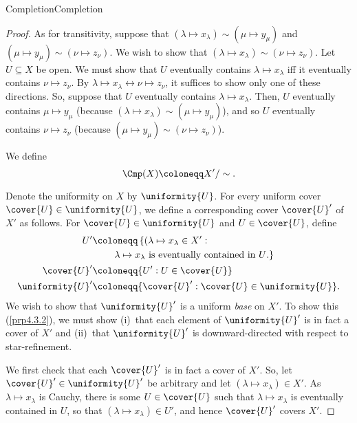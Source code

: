 \begin{thm}{Completion}{Completion}
\begin{proof}
As for transitivity, suppose that $(\lambda \mapsto x_\lambda )\sim (\mu \mapsto y_\mu )$ and $(\mu \mapsto y_\mu )\sim (\nu \mapsto z_\nu)$.  We wish to show that $(\lambda \mapsto x_\lambda )\sim (\nu \mapsto z_\nu )$.  Let $U\subseteq X$ be open.  We must show that $U$ eventually contains $\lambda \mapsto x_\lambda$ iff it eventually contains $\nu \mapsto z_\nu$.  By $\lambda \mapsto x_\lambda \leftrightarrow \nu \mapsto z_\nu$, it suffices to show only one of these directions.  So, suppose that $U$ eventually contains $\lambda \mapsto x_\lambda$.  Then, $U$ eventually contains $\mu \mapsto y_\mu$ (because $(\lambda \mapsto x_\lambda )\sim (\mu \mapsto y_\mu )$), and so $U$ eventually contains $\nu \mapsto z_\nu$ (because $(\mu \mapsto y_\mu )\sim (\nu \mapsto z_\nu )$).

We define
\begin{equation}
\Cmp (X)\coloneqq X'/\sim .
\end{equation}

Denote the uniformity on $X$ by $\uniformity{U}$.  For every uniform cover $\cover{U}\in \uniformity{U}$, we define a corresponding cover $\cover{U}'$ of $X'$ as follows.  For $\cover{U}\in \uniformity{U}$ and $U\in \cover{U}$, define
\begin{equation}\label{B.26}
\begin{split}
U' & \coloneqq \left\{ (\lambda \mapsto x_{\lambda}\in X':\right. \\ & \qquad \left. \lambda \mapsto x_{\lambda}\text{ is eventually contained in }U\text{.}\right\} \\
\cover{U}' & \coloneqq \{ U':U\in \cover{U}\} \\
\uniformity{U}' & \coloneqq \{ \cover{U}':\cover{U}\in \uniformity{U}\} .
\end{split}
\end{equation}
We wish to show that $\uniformity{U}'$ is a uniform \emph{base} on $X'$.  To show this (\cref{prp4.3.2}), we must show (i)~that each element of $\uniformity{U}'$ is in fact a cover of $X'$ and (ii)~that $\uniformity{U}'$ is downward-directed with respect to star-refinement.

We first check that each $\cover{U}'$ is in fact a cover of $X'$.  So, let $\cover{U}'\in \uniformity{U}'$ be arbitrary and let $(\lambda \mapsto x_{\lambda})\in X'$.  As $\lambda \mapsto x_{\lambda}$ is Cauchy, there is some $U\in \cover{U}$ such that $\lambda \mapsto x_{\lambda}$ is eventually contained in $U$, so that $(\lambda \mapsto x_{\lambda})\in U'$, and hence $\cover{U}'$ covers $X'$.


\end{proof}
\end{thm}
